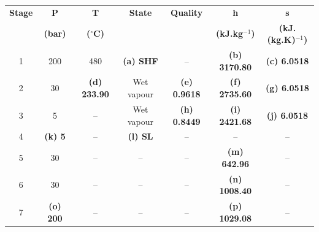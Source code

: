 \documentclass[calculator,steamtables,refrigeranttables,psychrometricchart,datasheet,resit]{exam}
\begin{document}
\begin{question}
\begin{enumerate}[(a)]
{\begin{center}
\begin{tabular}{c | c c c c c c} 
\hline
{\bf Stage} & {\bf P}       & {\bf T}            &  {\bf State}  &  {\bf Quality}  & {\bf h}             & {\bf s}                  \\
            & {\bf (bar)}   & {\bf ($^{\circ}$C)} &               &                 &{\bf (kJ.kg$^{-1}$)}  & {\bf (kJ.(kg.K)$^{-1}$)}  \\
\hline
1           &  200          & 480                &  {\bf (a) SHF}&   --            & {\bf (b) 3170.80}    & {\bf (c) 6.0518}         \\
2           &  30           & {\bf (d) 233.90}    &  Wet vapour   & {\bf (e) 0.9618}& {\bf (f) 2735.60}   & {\bf (g) 6.0518}         \\
3           &  5            & --                 &  Wet vapour   & {\bf (h) 0.8449}& {\bf (i) 2421.68}   & {\bf (j) 6.0518}          \\
4           &  {\bf (k) 5}  &  --                &  {\bf (l) SL} & --              &   --                &   --                      \\
5           &  30           &  --                &   --          &  --             & {\bf (m) 642.96}    &  --                       \\
6           &  30           &  --                &   --          &  --             & {\bf (n) 1008.40}    &  --                       \\
7           &  {\bf (o) 200}&  --                &   --          &  --             & {\bf (p) 1029.08}   &  --                       \\
\hline
\end{tabular}
\end{center}

}


\end{enumerate}
\end{question}
\end{document}
